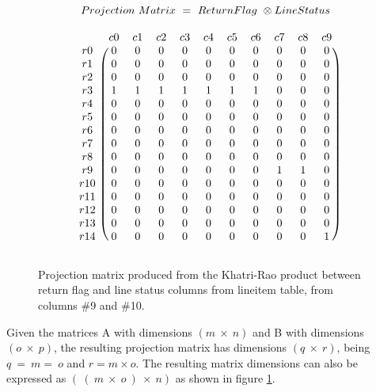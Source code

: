 \begin{equation}
\centering
Projection\ Matrix\ =\ ReturnFlag\ \otimes LineStatus
\label{eq:khatri_1}
\end{equation}


  
\begin{figure}[H]
\centering
\caption{Projection matrix produced from the Khatri-Rao product between return flag and line status columns from lineitem table, from columns \#9 and \#10.}
\[
\begin{blockarray}{ccccccccccc}
		& c	0	& c	1	& c	2	& c	3	& c	4	& c	5	& c	6	& c	7	& c	8	& c	9	\\
\begin{block}{c(cccccccccc)}
r	0	&	0	&	0	&	0	&	0	&	0	&	0	&	0	&	0	&	0	&	0	\\
r	1	&	0	&	0	&	0	&	0	&	0	&	0	&	0	&	0	&	0	&	0	\\
r	2	&	0	&	0	&	0	&	0	&	0	&	0	&	0	&	0	&	0	&	0	\\
r	3	&	1	&	1	&	1	&	1	&	1	&	1	&	1	&	0	&	0	&	0	\\
r	4	&	0	&	0	&	0	&	0	&	0	&	0	&	0	&	0	&	0	&	0	\\
r	5	&	0	&	0	&	0	&	0	&	0	&	0	&	0	&	0	&	0	&	0	\\
r	6	&	0	&	0	&	0	&	0	&	0	&	0	&	0	&	0	&	0	&	0	\\
r	7	&	0	&	0	&	0	&	0	&	0	&	0	&	0	&	0	&	0	&	0	\\
r	8	&	0	&	0	&	0	&	0	&	0	&	0	&	0	&	0	&	0	&	0	\\
r	9	&	0	&	0	&	0	&	0	&	0	&	0	&	0	&	1	&	1	&	0	\\
r	10	&	0	&	0	&	0	&	0	&	0	&	0	&	0	&	0	&	0	&	0	\\
r	11	&	0	&	0	&	0	&	0	&	0	&	0	&	0	&	0	&	0	&	0	\\
r	12	&	0	&	0	&	0	&	0	&	0	&	0	&	0	&	0	&	0	&	0	\\
r	13	&	0	&	0	&	0	&	0	&	0	&	0	&	0	&	0	&	0	&	0	\\
r	14	&	0	&	0	&	0	&	0	&	0	&	0	&	0	&	0	&	0	&	1	\\
\end{block}
\end{blockarray}
\]
\label{fig:example_matrix_krao}
\end{figure}

Given the matrices A with dimensions $(m\ \times\ n)$ and B with dimensions $(o\ \times\ p)$, the resulting projection matrix has dimensions $(q\ \times\ r)$, being $q\ =\ m =\ o$ and $r = m \times o$. The resulting matrix dimensions can also be expressed as $(\ (\ m\ \times\ o\ )\ \times\ n)$ as shown in figure \ref{fig:example_matrix_krao}.\par

